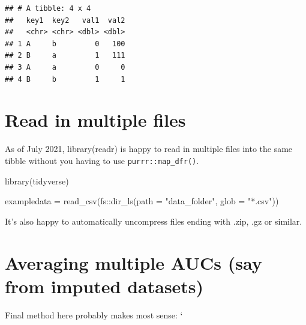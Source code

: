\documentclass[
]{book}
\newenvironment{Shaded}{\begin{snugshade}}{\end{snugshade}}
\newcommand{\AttributeTok}[1]{\textcolor[rgb]{0.77,0.63,0.00}{#1}}
\newcommand{\FunctionTok}[1]{\textcolor[rgb]{0.00,0.00,0.00}{#1}}
\newcommand{\NormalTok}[1]{#1}
\newcommand{\OtherTok}[1]{\textcolor[rgb]{0.56,0.35,0.01}{#1}}
\newcommand{\SpecialCharTok}[1]{\textcolor[rgb]{0.00,0.00,0.00}{#1}}
\newcommand{\StringTok}[1]{\textcolor[rgb]{0.31,0.60,0.02}{#1}}
\begin{document}
\begin{verbatim}
## # A tibble: 4 x 4
##   key1  key2   val1  val2
##   <chr> <chr> <dbl> <dbl>
## 1 A     b         0   100
## 2 B     a         1   111
## 3 A     a         0     0
## 4 B     b         1     1
\end{verbatim}

\hypertarget{read-in-multiple-files}{%
\section{Read in multiple files}\label{read-in-multiple-files}}

As of July 2021, library(readr) is happy to read in multiple files into the same tibble without you having to use \texttt{purrr::map\_dfr()}.

\begin{Shaded}
\begin{Highlighting}[]
\FunctionTok{library}\NormalTok{(tidyverse)}

\NormalTok{exampledata }\OtherTok{=} \FunctionTok{read\_csv}\NormalTok{(fs}\SpecialCharTok{::}\FunctionTok{dir\_ls}\NormalTok{(}\AttributeTok{path =} \StringTok{"data\_folder"}\NormalTok{, }\AttributeTok{glob =} \StringTok{"*.csv"}\NormalTok{))}
\end{Highlighting}
\end{Shaded}

It's also happy to automatically uncompress files ending with .zip, .gz or similar.

\hypertarget{averaging-multiple-aucs-say-from-imputed-datasets}{%
\section{Averaging multiple AUCs (say from imputed datasets)}\label{averaging-multiple-aucs-say-from-imputed-datasets}}

Final method here probably makes most sense: `
\end{document}
